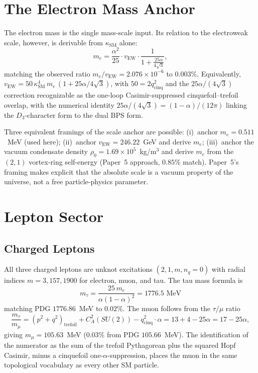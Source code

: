 \documentclass[11pt]{article}
\newcommand{\CA}{C_A}
\newcommand{\ksm}{\kappa_\text{SM}}
\begin{document}
\section{The Electron Mass Anchor}
\label{sec:electron}

The electron mass is the single mass-scale input.  Its relation to
the electroweak scale, however, is derivable from $\ksm$ alone:
\begin{equation}
  m_e = \frac{\alpha^2}{25} \cdot v_\text{EW} \cdot
        \frac{1}{1 + \tfrac{25\alpha}{4\sqrt{3}}},
\label{eq:me-vew}
\end{equation}
matching the observed ratio $m_e/v_\text{EW} = 2.076\times 10^{-6}$
to $0.003\%$.  Equivalently, $v_\text{EW} =
50\,\ksm^4\,m_e\,(1+25\alpha/4\sqrt{3})$, with $50 = 2 q^2_\text{cinq}$
and the $25\alpha/(4\sqrt{3})$ correction recognizable as the one-loop
Casimir-suppressed cinquefoil--trefoil overlap, with the numerical
identity $25\alpha/(4\sqrt{3}) = (1-\alpha)/(12\pi)$ linking the
$D_3$-character form to the dual BPS form.

Three equivalent framings of the scale anchor are possible:
(i)~anchor $m_e = 0.511$~MeV (used here);
(ii)~anchor $v_\text{EW} = 246.22$~GeV and derive $m_e$;
(iii)~anchor the vacuum condensate density $\rho_0 = 1.69\times
10^5$~kg/m$^3$ and derive $m_e$ from the $(2,1)$ vortex-ring
self-energy (Paper~5 approach, $0.85\%$ match).  Paper~5's
framing makes explicit that the absolute scale is a vacuum
property of the universe, not a free particle-physics parameter.

\section{Lepton Sector}
\label{sec:leptons}

\subsection{Charged Leptons}

All three charged leptons are unknot excitations $(2,1,m,n_q=0)$
with radial indices $m = 3, 157, 1900$ for electron, muon, and tau.
The tau mass formula is
\begin{equation}
  m_\tau = \frac{25\,m_e}{\alpha(1-\alpha)^2}
        = 1776.5\text{ MeV}
\end{equation}
matching PDG $1776.86$~MeV to $0.02\%$.  The muon follows from the
$\tau/\mu$ ratio
\begin{equation}
  \frac{m_\tau}{m_\mu} = (p^2+q^2)_\text{trefoil} + \CA^2(SU(2))
    - q^2_\text{cinq}\cdot\alpha = 13 + 4 - 25\alpha = 17 - 25\alpha,
\end{equation}
giving $m_\mu = 105.63$~MeV ($0.03\%$ from PDG $105.66$~MeV).  The
identification of the numerator as the sum of the trefoil
Pythagorean plus the squared Hopf Casimir, minus a cinquefoil
one-$\alpha$-suppression, places the muon in the same topological
vocabulary as every other SM particle.
\end{document}
